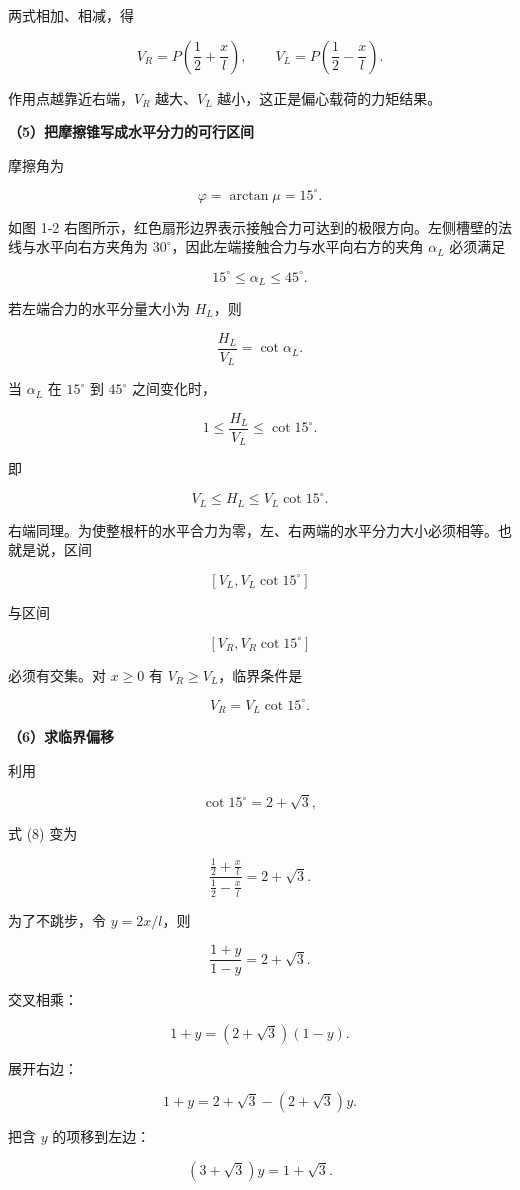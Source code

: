 \documentclass[12pt,a4paper,UTF8]{ctexart}
\begin{document}
两式相加、相减，得

\[
\boxed{V_R=P\left(\frac12+\frac{x}{l}\right)},
\qquad
\boxed{V_L=P\left(\frac12-\frac{x}{l}\right)}.
\]

作用点越靠近右端，\(V_R\) 越大、\(V_L\) 越小，这正是偏心载荷的力矩结果。

\textbf{（5）把摩擦锥写成水平分力的可行区间}

摩擦角为

\[
\varphi=\arctan\mu=15^\circ.
\]

如图 1-2
右图所示，红色扇形边界表示接触合力可达到的极限方向。左侧槽壁的法线与水平向右方夹角为
\(30^\circ\)，因此左端接触合力与水平向右方的夹角 \(\alpha_L\) 必须满足

\[15^\circ\le\alpha_L\le45^\circ.\]

若左端合力的水平分量大小为 \(H_L\)，则

\[
\frac{H_L}{V_L}=\cot\alpha_L.
\]

当 \(\alpha_L\) 在 \(15^\circ\) 到 \(45^\circ\) 之间变化时，

\[
1\le\frac{H_L}{V_L}\le\cot15^\circ.
\]

即

\[
V_L\le H_L\le V_L\cot15^\circ. \tag{7}
\]

右端同理。为使整根杆的水平合力为零，左、右两端的水平分力大小必须相等。也就是说，区间

\[[V_L,V_L\cot15^\circ]\]

与区间

\[[V_R,V_R\cot15^\circ]\]

必须有交集。对 \(x\ge0\) 有 \(V_R\ge V_L\)，临界条件是

\[
V_R=V_L\cot15^\circ. \tag{8}
\]

\textbf{（6）求临界偏移}

利用

\[
\cot15^\circ=2+\sqrt3,
\]

式 (8) 变为

\[
\frac{\frac12+\frac{x}{l}}{\frac12-\frac{x}{l}}=2+\sqrt3.
\]

为了不跳步，令 \(y=2x/l\)，则

\[
\frac{1+y}{1-y}=2+\sqrt3.
\]

交叉相乘：

\[
1+y=(2+\sqrt3)(1-y).
\]

展开右边：

\[
1+y=2+\sqrt3-(2+\sqrt3)y.
\]

把含 \(y\) 的项移到左边：

\[
(3+\sqrt3)y=1+\sqrt3.
\]
\end{document}
